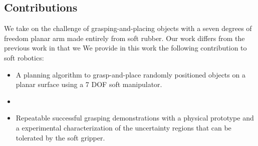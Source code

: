 \subsection{Contributions}
We take on the challenge of grasping-and-placing objects with a seven degrees of freedom planar arm made entirely from soft rubber. 
Our work differs from the previous work in that we  
We provide in this work the following contribution to soft robotics:
\begin{itemize}
  \item A planning algorithm to grasp-and-place randomly positioned objects on a planar surface using a 7 DOF soft manipulator.  
  \item {}   
   \item Repeatable successful grasping demonstrations with a physical prototype and a  experimental characterization of the uncertainty regions that can be tolerated by the soft gripper.
\end{itemize}

